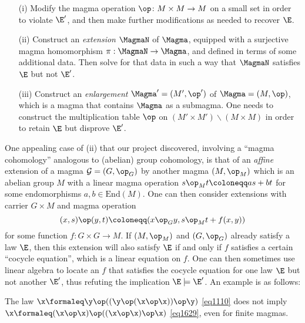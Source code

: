\begin{itemize}
  \item[(i)]  Modify the magma operation $\op \colon M \times M \to M$ on a small set in order to violate ${\E'}$, and then make further modifications as needed to recover $\E$.
  \item[(ii)]  Construct an \emph{extension} $\MagmaN$ of $\Magma$, equipped with a surjective magma homomorphism $\pi: \MagmaN \to \Magma$, and defined in terms of some additional data.  Then solve for that data in such a way that $\MagmaN$ satisfies $\E$ but not ${\E'}$.
  \item[(iii)]  Construct an \emph{enlargement} $\Magma' = (M',\op')$ of $\Magma = (M,\op)$, which is a magma that contains $\Magma$ as a submagma.  One needs to construct the multiplication table $\op$ on $(M' \times M') \backslash (M \times M)$ in order to retain $\E$ but disprove ${\E'}$.
\end{itemize}

One appealing case of (ii) that our project discovered, involving a ``magma cohomology'' analogous to (abelian) group cohomology, is that of an \emph{affine} extension of a magma ${\mathcal G} = (G,\op_G)$ by another magma $(M,\op_M)$ which is an abelian group $M$ with a linear magma operation $s \op_M t \coloneqq as + bt$ for some endomorphisms $a,b \in \mathrm{End}(M)$.  One can then consider extensions with carrier $G \times M$ and magma operation
\begin{equation}\label{xsyt}
 (x, s) \op (y, t) \coloneqq (x \op_G y, s \op_M t + f(x,y))
\end{equation}
for some function $f \colon G \times G \to M$.  If $(M,\op_M)$ and $(G,\op_G)$ already satisfy a law $\E$, then this extension will also satisfy $\E$ if and only if $f$ satisfies a certain ``cocycle equation'', which is a linear equation on $f$.  One can then sometimes use linear algebra to locate an $f$ that satisfies the cocycle equation for one law $\E$ but not another ${\E'}$, thus refuting the implication $\E \models {\E'}$.  An example is as follows:

\begin{proposition}\label{1110-1629} The law $\x \formaleq \y \op ((\y \op (\x \op \x)) \op \y)$ \eqref{eq1110} does not imply $\x \formaleq (\x \op \x) \op ((\x \op \x) \op \x)$ \eqref{eq1629}, even for finite magmas.
\end{proposition}

